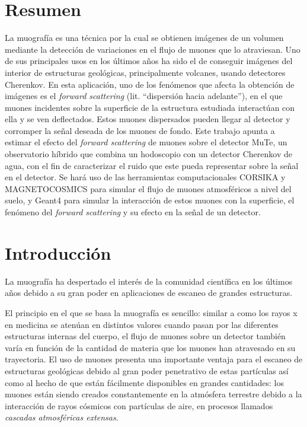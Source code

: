 \documentclass[12pt]{report}
\begin{document}

\section*{Resumen}

La muografía es una técnica por la cual se obtienen imágenes de un volumen mediante la detección de variaciones en el flujo de muones que lo atraviesan. Uno de sus principales usos en los últimos años ha sido el de conseguir imágenes del interior de estructuras geológicas, principalmente volcanes, usando detectores Cherenkov. En esta aplicación, uno de los fenómenos que afecta la obtención de imágenes es el \textit{forward scattering} (lit. ``dispersión hacia adelante''), en el que muones incidentes sobre la superficie de la estructura estudiada interactúan con ella y se ven deflectados. Estos muones dispersados pueden llegar al detector y corromper la señal deseada de los muones de fondo. Este trabajo apunta a estimar el efecto del \textit{forward scattering} de muones sobre el detector MuTe, un observatorio híbrido que combina un hodoscopio con un detector Cherenkov de agua, con el fin de caracterizar el ruido que este pueda representar sobre la señal en el detector. Se hará uso de las herramientas computacionales CORSIKA y MAGNETOCOSMICS para simular el flujo de muones atmosféricos a nivel del suelo, y Geant4 para simular la interacción de estos muones con la superficie, el fenómeno del \textit{forward scattering} y su efecto en la señal de un detector.


\section*{Introducción}



La muografía ha despertado el interés de la comunidad científica en los últimos años debido a su gran poder en aplicaciones de escaneo de grandes estructuras.

El principio en el que se basa la muografía es sencillo: similar a como los rayos x en medicina se atenúan en distintos valores cuando pasan por las diferentes estructuras internas del cuerpo, el flujo de muones sobre un detector también varía en función de la cantidad de materia que los muones han atravesado en su trayectoria. El uso de muones presenta una importante ventaja para el escaneo de estructuras geológicas debido al gran poder penetrativo de estas partículas así como al hecho de que están fácilmente disponibles en grandes cantidades: los muones están siendo creados constantemente en la atmósfera terrestre debido a la interacción de rayos cósmicos con partículas de aire, en procesos llamados \textit{cascadas atmosféricas extensas}.
\end{document}
